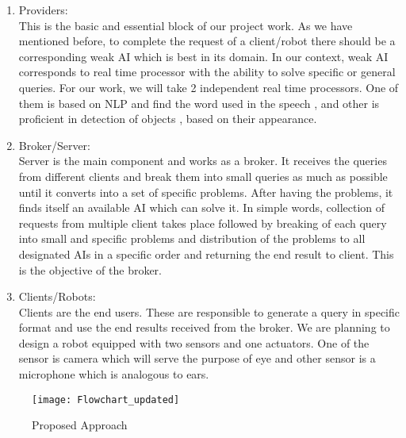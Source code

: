 \documentclass{article}
\begin{document}
\begin{enumerate}
	\item Providers:\\
This is the basic and essential block of our project work. As we have mentioned before, to complete the request of a client/robot there should be a corresponding weak AI which is best in its domain. In our context, weak AI corresponds to real time processor with the ability to solve specific or general queries. For our work, we will take 2 independent real time processors. One of them is based on NLP and find the word used in the speech \cite{nlp}, and other is proficient in detection of objects \cite{cv}, based on  their appearance. 

	\item Broker/Server: \\
Server is the main component and works as a broker. It receives the queries from different clients and break them into small queries as much as possible until it converts into a set of specific problems. After having the problems, it finds itself an available AI which can solve it. In simple words, collection of requests from multiple client takes place followed by breaking of each query into small and specific problems and distribution of the problems to all designated AIs in a specific order and returning the end result to client. This is the objective of the broker.  

	\item Clients/Robots: \\
Clients are the end users. These are responsible to generate a query in specific format and use the end results received from the broker. We are planning to design a robot equipped with two sensors and one actuators. One of the sensor is camera which will serve the purpose of eye and other sensor is a microphone which is analogous to ears. 

\end{enumerate} 

\begin{figure}
\label{Fig1}
\centering
\texttt{[image: Flowchart\_updated]}
\caption{Proposed Approach}
\end{figure}



\end{document}
